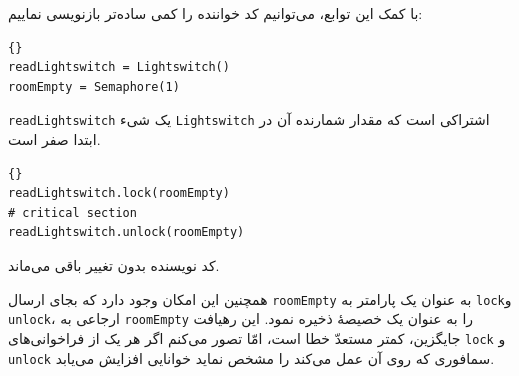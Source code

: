 \documentclass{book}
\begin{document}
\newpage
    با کمک این توابع، می‌توانیم کد خواننده را کمی ساده‌تر بازنویسی نماییم: 

\begin{latin}
\begin{latin}
\begin{lstlisting}[title=\rl{مقدار دهی اولیه خوانندگان-نویسندگان}]{}
readLightswitch = Lightswitch()
roomEmpty = Semaphore(1)
\end{lstlisting}
\end{latin}
\end{latin}

    {\tt readLightswitch} 
    یک شیء  {\tt Lightswitch} اشتراکی است که مقدار شمارنده آن در ابتدا صفر است. 


\begin{latin}
\begin{latin}
\begin{lstlisting}[title=\rl{راه حل خوانندگان-نویسندگان (خواننده)}]{}
readLightswitch.lock(roomEmpty)
# critical section
readLightswitch.unlock(roomEmpty)
\end{lstlisting}
\end{latin}
\end{latin}

    کد نویسنده بدون تغییر باقی می‌ماند. 

    همچنین این امکان وجود دارد که بجای ارسال {\tt roomEmpty} به عنوان یک پارامتر به {\tt lock}و  {\tt unlock}، 
    ارجاعی  به {\tt roomEmpty} را به عنوان یک خصیصهٔ‌  ذخیره نمود. این رهیافت جایگزین، کمتر مستعدّ خطا است،
    امّا تصور می‌کنم اگر هر یک از فراخوانی‌های {\tt lock} و  {\tt unlock} سمافوری که روی آن عمل می‌کند را مشخص نماید خوانایی افزایش می‌یابد. 
    
\end{document}
